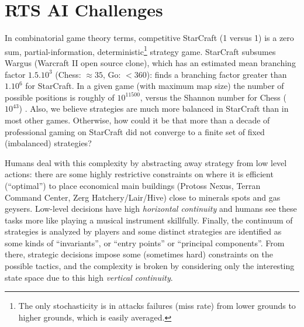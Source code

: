 \section{RTS AI Challenges}
\label{sec:rtsaichallenges}
In combinatorial game theory terms, competitive StarCraft (1 versus 1) is a zero sum, partial-information, deterministic\footnote{The only stochasticity is in attacks failures (miss rate) from lower grounds to higher grounds, which is easily averaged.} strategy game. 
StarCraft subsumes Wargus (Warcraft II open source clone), which has an estimated mean branching factor $1.5.10^3$ \citep{LTW} (Chess: $\approx 35$, Go: $<360$): \cite{bgweberPhD} finds a branching factor greater than $1.10^6$ for StarCraft. In a given game (with maximum map size) the number of possible positions is roughly of $10^{11500}$, versus the Shannon number for Chess ($10^{43}$) \citep{Shannon_1950}. Also, we believe strategies are much more balanced in StarCraft than in most other games. Otherwise, how could it be that more than a decade of professional gaming on StarCraft did not converge to a finite set of fixed (imbalanced) strategies?

Humans deal with this complexity by abstracting away strategy from low level actions: there are some highly restrictive constraints on where it is efficient (``optimal'') to place economical main buildings (Protoss Nexus, Terran Command Center, Zerg Hatchery/Lair/Hive) close to minerals spots and gas geysers. Low-level  decisions have high \textit{horizontal continuity} and humans see these tasks more like playing a musical instrument skillfully. Finally, the continuum of strategies is analyzed by players and some distinct strategies are identified as some kinds of ``invariants'', or ``entry points'' or ``principal components''. From there, strategic decisions impose some (sometimes hard) constraints on the possible tactics, and the complexity is broken by considering only the interesting state space due to this high \textit{vertical continuity}.

